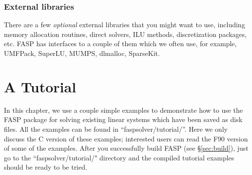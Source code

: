 \documentclass[11pt]{memoir}
\begin{document}

\subsection{External libraries}\label{ssec:lib}

There are a few \emph{optional} external libraries that you might want to use, including memory allocation routines, direct solvers, ILU methods, discretization packages, etc. FASP has interfaces to a couple of them which we often use, for example, UMFPack, SuperLU, MUMPS, dlmalloc, SparseKit.


\chapter{A Tutorial}\label{ch:tutor}

In this chapter, we use a couple simple examples to demonstrate how to use the FASP package for solving existing linear systems which have been saved as disk files. All the examples can be found in ``faspsolver/tutorial/''. Here we only discuss the C version of these examples; interested users can read the F90 version of some of the examples. After you successfully build FASP (see \S\ref{sec:build}), just go to the ``faspsolver/tutorial/" directory and the compiled tutorial examples should be ready to be tried.
\end{document}
